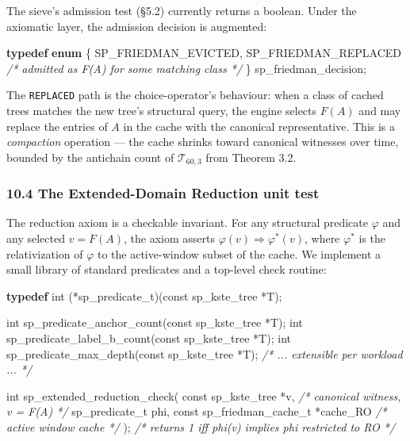 \documentclass[
  11pt,
]{article}
\newenvironment{Shaded}{}{}
\newcommand{\CommentTok}[1]{\textcolor[rgb]{0.38,0.63,0.69}{\textit{#1}}}
\newcommand{\DataTypeTok}[1]{\textcolor[rgb]{0.56,0.13,0.00}{#1}}
\newcommand{\KeywordTok}[1]{\textcolor[rgb]{0.00,0.44,0.13}{\textbf{#1}}}
\newcommand{\NormalTok}[1]{#1}
\begin{document}
The sieve's admission test (§5.2) currently returns a boolean. Under the
axiomatic layer, the admission decision is augmented:

\begin{Shaded}
\begin{Highlighting}[]
\KeywordTok{typedef} \KeywordTok{enum}\NormalTok{ \{}
\NormalTok{    SP\_FRIEDMAN\_EVICTED,}
\NormalTok{    SP\_FRIEDMAN\_REPLACED  }\CommentTok{/* admitted as F(A) for some matching class */}
\NormalTok{\} sp\_friedman\_decision;}
\end{Highlighting}
\end{Shaded}

The \texttt{REPLACED} path is the choice-operator's behaviour: when a
class of cached trees matches the new tree's structural query, the
engine selects \(F(A)\) and may replace the entries of \(A\) in the
cache with the canonical representative. This is a \emph{compaction}
operation --- the cache shrinks toward canonical witnesses over time,
bounded by the antichain count of \(\mathcal{T}_{60,3}\) from Theorem
3.2.

\hypertarget{the-extended-domain-reduction-unit-test}{%
\subsubsection{10.4 The Extended-Domain Reduction unit
test}\label{the-extended-domain-reduction-unit-test}}

The reduction axiom is a checkable invariant. For any structural
predicate \(\varphi\) and any selected \(v = F(A)\), the axiom asserts
\(\varphi(v) \Rightarrow \varphi^*(v)\), where \(\varphi^*\) is the
relativization of \(\varphi\) to the active-window subset of the cache.
We implement a small library of standard predicates and a top-level
check routine:

\begin{Shaded}
\begin{Highlighting}[]
\KeywordTok{typedef} \DataTypeTok{int}\NormalTok{ (*sp\_predicate\_t)(}\DataTypeTok{const}\NormalTok{ sp\_kste\_tree *T);}

\DataTypeTok{int}\NormalTok{ sp\_predicate\_anchor\_count(}\DataTypeTok{const}\NormalTok{ sp\_kste\_tree *T);}
\DataTypeTok{int}\NormalTok{ sp\_predicate\_label\_b\_count(}\DataTypeTok{const}\NormalTok{ sp\_kste\_tree *T);}
\DataTypeTok{int}\NormalTok{ sp\_predicate\_max\_depth(}\DataTypeTok{const}\NormalTok{ sp\_kste\_tree *T);}
\CommentTok{/* ... extensible per workload ... */}

\DataTypeTok{int}\NormalTok{ sp\_extended\_reduction\_check(}
    \DataTypeTok{const}\NormalTok{ sp\_kste\_tree *v,                }\CommentTok{/* canonical witness, v = F(A) */}
\NormalTok{    sp\_predicate\_t      phi,}
    \DataTypeTok{const}\NormalTok{ sp\_friedman\_cache\_t *cache\_RO   }\CommentTok{/* active window cache */}
\NormalTok{);}
\CommentTok{/* returns 1 iff phi(v) implies phi restricted to RO */}
\end{Highlighting}
\end{Shaded}
\end{document}
